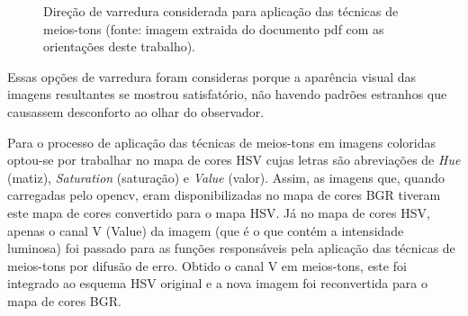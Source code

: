 \documentclass{article}
\begin{document}
\begin{figure}[!htp]%
	\centering
	\qquad
	\caption{Direção de varredura considerada para aplicação das técnicas de meios-tons (fonte: imagem extraida do documento pdf com as orientações deste trabalho).}%
	\label{fig:direcao_varredura}%
\end{figure}

\noindent
Essas opções de varredura foram consideras porque a aparência visual das imagens resultantes se mostrou satisfatório, não havendo padrões estranhos que causassem desconforto ao olhar do observador.

Para o processo de aplicação das técnicas de meios-tons em imagens coloridas optou-se por trabalhar no mapa de cores HSV cujas letras são abreviações de \textit{Hue} (matiz), \textit{Saturation} (saturação) e \textit{Value} (valor). Assim, as imagens que, quando carregadas pelo opencv, eram disponibilizadas no mapa de cores BGR tiveram este mapa de cores convertido para o mapa HSV. Já no mapa de cores HSV, apenas o canal V (Value) da imagem (que é o que contém a intensidade luminosa) foi passado para as funções responsáveis pela aplicação das técnicas de meios-tons por difusão de erro. Obtido o canal V em meios-tons, este foi integrado ao esquema HSV original e a nova imagem foi reconvertida para o mapa de cores BGR.
\end{document}
